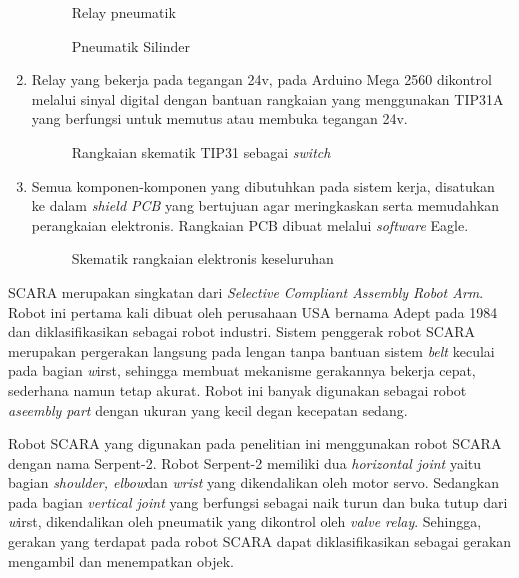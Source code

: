 \begin{enumerate}
		\begin{figure}[H]
			\centering
			\caption{Relay pneumatik}
		\end{figure}
		\begin{figure}[H]
			\centering
			\caption{Pneumatik Silinder}
		\end{figure}
		
		\item Relay yang bekerja pada tegangan 24v, pada Arduino Mega 2560 dikontrol melalui sinyal digital dengan bantuan rangkaian yang menggunakan TIP31A yang berfungsi untuk memutus atau membuka tegangan 24v. 
		\begin{figure}[H]
			\centering
			\caption{Rangkaian skematik TIP31 sebagai \textit{switch}}
		\end{figure}
		
		\item Semua komponen-komponen yang dibutuhkan pada sistem kerja, disatukan ke dalam \textit{shield PCB} yang bertujuan agar meringkaskan serta memudahkan perangkaian elektronis. Rangkaian PCB dibuat melalui \textit{software} Eagle.
		\begin{figure}[H]
			\centering
			\caption{Skematik rangkaian elektronis keseluruhan}
		\end{figure}
		
		
	\end{enumerate}



SCARA merupakan singkatan dari \emph{Selective Compliant Assembly Robot Arm}. Robot ini pertama kali dibuat oleh perusahaan USA bernama Adept pada 1984 dan diklasifikasikan sebagai robot industri. Sistem penggerak robot SCARA merupakan pergerakan langsung pada lengan tanpa bantuan sistem \emph{belt} keculai pada bagian \emph wirst, sehingga membuat mekanisme gerakannya bekerja cepat, sederhana namun tetap akurat. Robot ini banyak digunakan sebagai robot \emph {aseembly part} dengan ukuran yang kecil degan kecepatan sedang. 


Robot SCARA yang digunakan pada penelitian ini menggunakan robot SCARA dengan nama Serpent-2. Robot Serpent-2 memiliki dua \textit{horizontal joint} yaitu bagian \textit{shoulder, elbow}dan \textit{wrist} yang dikendalikan oleh motor servo. Sedangkan pada bagian \textit{vertical joint} yang berfungsi sebagai naik turun dan buka tutup dari \emph wirst, dikendalikan oleh pneumatik yang dikontrol oleh \emph {valve relay}. Sehingga, gerakan yang terdapat pada robot SCARA dapat diklasifikasikan sebagai gerakan mengambil dan menempatkan objek. 


